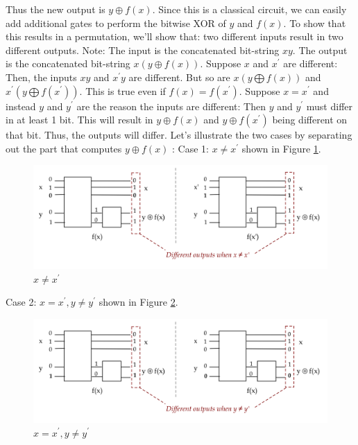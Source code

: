 \documentclass[main.tex]{subfiles}
\begin{document}
    Thus the new output is $y \oplus f(x)$. Since this is a classical circuit, we can easily add additional gates to perform the bitwise XOR of $y$ and $f(x)$. To show that this results in a permutation, we'll show that: two different inputs result in two different outputs. Note: The input is the concatenated bit-string $xy$. The output is the concatenated bit-string $x(y \oplus f(x))$. Suppose $x$ and $x^{\prime}$ are different: Then, the inputs $x y$ and $x^{\prime} y$ are different. But so are $x(y \bigoplus f(x))$ and $x^{\prime}\left(y \bigoplus f\left(x^{\prime}\right)\right)$. This is true even if $f(x)=f\left(x^{\prime}\right)$. Suppose $x=x^{\prime}$ and instead $y$ and $y^{\prime}$ are the reason the inputs are different: Then $y$ and $y^{\prime}$ must differ in at least 1 bit. This will result in $y \oplus f(x)$ and $y \oplus f\left(x^{\prime}\right)$ being different on that bit. Thus, the outputs will differ. Let's illustrate the two cases by separating out the part that computes $y \oplus f(x)$ : Case 1: $x \neq x^{\prime}$ shown in Figure \ref{fig:33permutation7}.
    
    \begin{figure}
        \centering
        \includegraphics[width=5in]{notes/figs/n10/33permutation7.png}
        \caption{$x \neq x^{\prime}$}
        \label{fig:33permutation7}
    \end{figure}
    
    Case 2: $x=x^{\prime}, y \neq y^{\prime}$ shown in Figure \ref{fig:34permutation8}.
    
    \begin{figure}
        \centering
        \includegraphics[width=5in]{notes/figs/n10/34permutation8.png}
        \caption{$x=x^{\prime}, y \neq y^{\prime}$}
        \label{fig:34permutation8}
    \end{figure}
    
\end{document}
